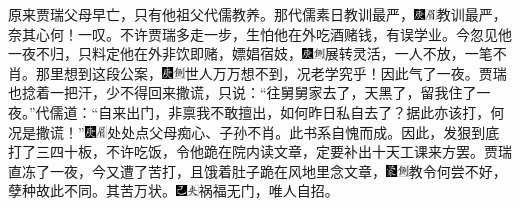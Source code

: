 原来贾瑞父母早亡，只有他祖父代儒教养。那代儒素日教训最严，{\includegraphics[width=3mm]{../Images/00004}\includegraphics[width=3mm]{../Images/00010}\footnotesize \kaishu 教训最严，奈其心何！一叹。}不许贾瑞多走一步，生怕他在外吃酒赌钱，有误学业。今忽见他一夜不归，只料定他在外非饮即赌，嫖娼宿妓，{\includegraphics[width=3mm]{../Images/00004}\includegraphics[width=3mm]{../Images/00011}\footnotesize \kaishu 展转灵活，一人不放，一笔不肖。}那里想到这段公案，{\includegraphics[width=3mm]{../Images/00004}\includegraphics[width=3mm]{../Images/00011}\footnotesize \kaishu 世人万万想不到，况老学究乎！}因此气了一夜。贾瑞也捻着一把汗，少不得回来撒谎，只说：“往舅舅家去了，天黑了，留我住了一夜。”代儒道：“自来出门，非禀我不敢擅出，如何昨日私自去了？据此亦该打，何况是撒谎！”{\includegraphics[width=3mm]{../Images/00004}\includegraphics[width=3mm]{../Images/00010}\footnotesize \kaishu 处处点父母痴心、子孙不肖。此书系自愧而成。}因此，发狠到底打了三四十板，不许吃饭，令他跪在院内读文章，定要补出十天工课来方罢。贾瑞直冻了一夜，今又遭了苦打，且饿着肚子跪在风地里念文章，{\includegraphics[width=3mm]{../Images/00006}\includegraphics[width=3mm]{../Images/00011}\footnotesize \kaishu 教令何尝不好，孽种故此不同。}其苦万状。{\includegraphics[width=3mm]{../Images/00003}\includegraphics[width=3mm]{../Images/00012}\footnotesize \kaishu 祸福无门，唯人自招。}

